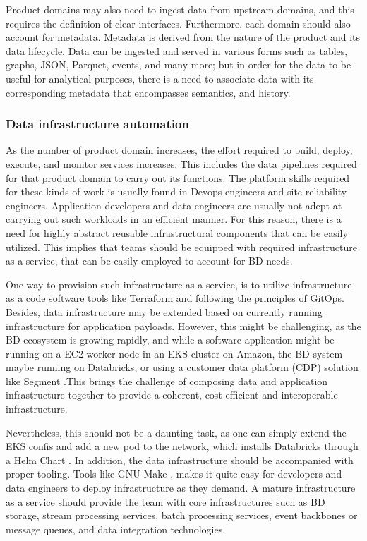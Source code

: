 \documentclass{bmcart}
\begin{document}
Product domains may also need to ingest data from upstream domains, and this requires the definition of clear interfaces. Furthermore, each domain should also account for metadata. Metadata is derived from the nature of the product and its data lifecycle. Data can be ingested and served in various forms such as tables, graphs, JSON, Parquet, events, and many more; but in order for the data to be useful for analytical purposes, there is a need to associate data with its corresponding metadata that encompasses semantics, and history.

\subsubsection{Data infrastructure automation}

As the number of product domain increases, the effort required to build, deploy, execute, and monitor services increases. This includes the data pipelines required for that product domain to carry out its functions. The platform skills required for these kinds of work is usually found in Devops engineers and site reliability engineers. Application developers and data engineers are usually not adept at carrying out such workloads in an efficient manner. For this reason, there is a need for highly abstract reusable infrastructural components that can be easily utilized. This implies that teams should be equipped with required infrastructure as a service, that can be easily employed to account for BD needs.

One way to provision such infrastructure as a service, is to utilize infrastructure as a code software tools like Terraform \cite{Terraform} and following the principles of GitOps. Besides, data infrastructure may be extended based on currently running infrastructure for application payloads. However, this might be challenging, as the BD ecosystem is growing rapidly, and while a software application might be running on a EC2 worker node in an EKS cluster on Amazon, the BD system maybe running on Databricks, or using a customer data platform (CDP) solution like Segment \cite{Segment}.This brings the challenge of composing data and application infrastructure together to provide a coherent, cost-efficient and interoperable infrastructure.

Nevertheless, this should not be a daunting task, as one can simply extend the EKS confis and add a new pod to the network, which installs Databricks through a Helm Chart \cite{Helm}. In addition, the data infrastructure should be accompanied with proper tooling. Tools like GNU Make \cite{Make}, makes it quite easy for developers and data engineers to deploy infrastructure as they demand.
A mature infrastructure as a service should provide the team with core infrastructures such as BD storage, stream processing services, batch processing services, event backbones or message queues, and data integration technologies.
\end{document}
